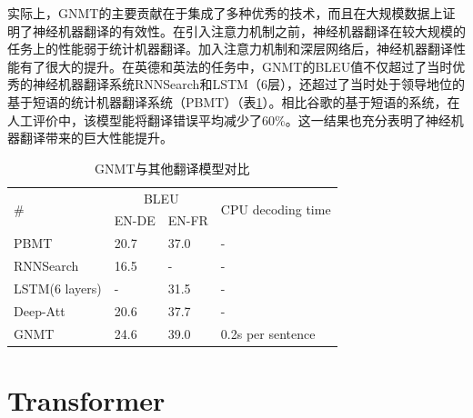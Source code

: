 \parinterval 实际上，GNMT的主要贡献在于集成了多种优秀的技术，而且在大规模数据上证明了神经机器翻译的有效性。在引入注意力机制之前，神经机器翻译在较大规模的任务上的性能弱于统计机器翻译。加入注意力机制和深层网络后，神经机器翻译性能有了很大的提升。在英德和英法的任务中，GNMT的BLEU值不仅超过了当时优秀的神经机器翻译系统RNNSearch和LSTM（6层），还超过了当时处于领导地位的基于短语的统计机器翻译系统（PBMT）（表\ref{tab:6-10}）。相比谷歌的基于短语的系统，在人工评价中，该模型能将翻译错误平均减少了60\%。这一结果也充分表明了神经机器翻译带来的巨大性能提升。

\begin{table}[htp]
\centering
\caption{GNMT与其他翻译模型对比\cite{Wu2016GooglesNM}}
\label{tab:6-10}
\begin{tabular}{l l l l}
\multicolumn{1}{l|}{\multirow{2}{*}{\#}} & \multicolumn{2}{c}{BLEU} & \multirow{2}{*}{CPU decoding time} \\
\multicolumn{1}{l|}{}                    & EN-DE  & EN-FR  &                                             \\ \hline
\multicolumn{1}{l|}{PBMT}                & 20.7            & 37.0            & -                                           \\
\multicolumn{1}{l|}{RNNSearch}           & 16.5            & -               & -                                           \\
\multicolumn{1}{l|}{LSTM(6 layers)}      & -               & 31.5            & -                                           \\
\multicolumn{1}{l|}{Deep-Att}            & 20.6            & 37.7            & -                                           \\
\multicolumn{1}{l|}{GNMT}                & 24.6            & 39.0            & 0.2s per sentence                           \\
\end{tabular}
\end{table}


\sectionnewpage
\section{Transformer}

